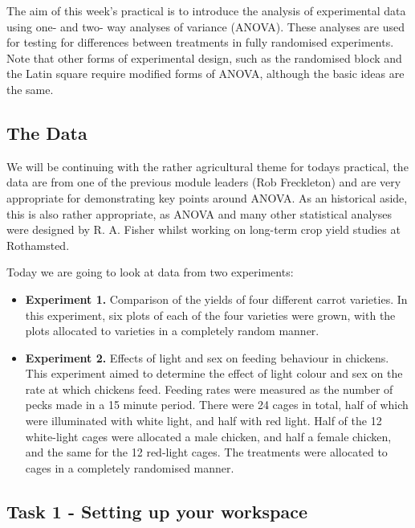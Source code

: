 \documentclass[
]{book}
\providecommand{\tightlist}{%
  \setlength{\itemsep}{0pt}\setlength{\parskip}{0pt}}
\begin{document}
The aim of this week's practical is to introduce the analysis of experimental data using one- and two- way analyses of variance (ANOVA). These analyses are used for testing for differences between treatments in fully randomised experiments. Note that other forms of experimental design, such as the randomised block and the Latin square require modified forms of ANOVA, although the basic ideas are the same.

\hypertarget{the-data-1}{%
\subsection{The Data}\label{the-data-1}}

We will be continuing with the rather agricultural theme for todays practical, the data are from one of the previous module leaders (Rob Freckleton) and are very appropriate for demonstrating key points around ANOVA. As an historical aside, this is also rather appropriate, as ANOVA and many other statistical analyses were designed by R. A. Fisher whilst working on long-term crop yield studies at Rothamsted.

Today we are going to look at data from two experiments:

\begin{itemize}
\tightlist
\item
  \textbf{Experiment 1.} Comparison of the yields of four different carrot varieties. In this experiment, six plots of each of the four varieties were grown, with the plots allocated to varieties in a completely random manner.
\item
  \textbf{Experiment 2.} Effects of light and sex on feeding behaviour in chickens. This experiment aimed to determine the effect of light colour and sex on the rate at which chickens feed. Feeding rates were measured as the number of pecks made in a 15 minute period. There were 24 cages in total, half of which were illuminated with white light, and half with red light. Half of the 12 white-light cages were allocated a male chicken, and half a female chicken, and the same for the 12 red-light cages. The treatments were allocated to cages in a completely randomised manner.
\end{itemize}

\hypertarget{task-1---setting-up-your-workspace-1}{%
\subsection{Task 1 - Setting up your workspace}\label{task-1---setting-up-your-workspace-1}}
\end{document}

